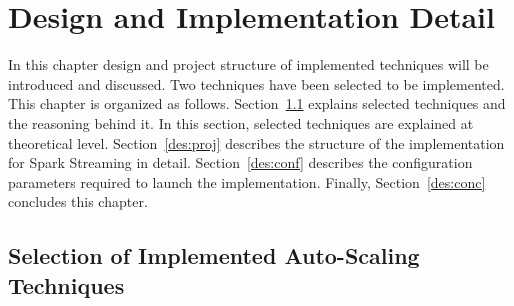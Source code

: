 \chapter{Design and Implementation Detail}
\label{design}
In this chapter design and project structure of implemented techniques will be introduced and discussed. Two techniques have been selected to be implemented. This chapter is organized as follows. Section~\ref{des:choose} explains selected techniques and the reasoning behind it. In this section, selected techniques are explained at theoretical level. Section~\ref{des:proj} describes the structure of the implementation for Spark Streaming in detail. Section~\ref{des:conf} describes the configuration parameters required to launch the implementation. Finally, Section~\ref{des:conc} concludes this chapter.

\section{Selection of Implemented Auto-Scaling Techniques}
\label{des:choose}

